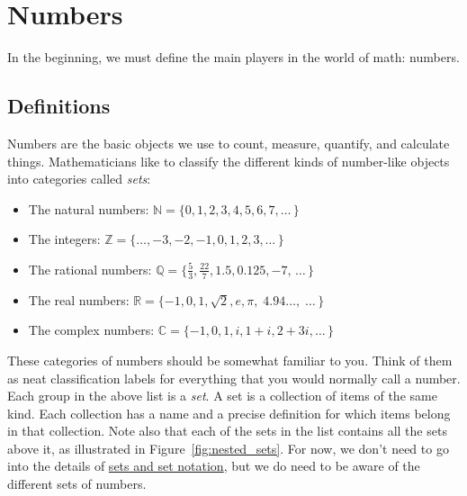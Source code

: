 
\section{Numbers}
\label{sec:numbers}

	In the beginning, we must define the main players in the world of math: numbers.

	\subsection{Definitions}
	\label{numbers:definitions}
		
		Numbers are the basic objects we use to count, measure, quantify, and calculate things.
		Mathematicians like to classify the different kinds of number-like objects into categories called \emph{sets}:					
		\begin{itemize}
			\item  The natural numbers: $\mathbb{N} = \{0,1,2,3,4,5,6,7, \ldots \, \}$
			\item  The integers: $\mathbb{Z} = \{\ldots, -3,-2,-1,0,1,2,3 , \ldots  \, \}$
			\item  The rational numbers: $\mathbb{Q} = \{\frac{5}{3}, \frac{22}{7}, 1.5, 0.125,  -7, \, \ldots \, \}$
			\item  The real numbers: $\mathbb{R} = \{-1,0,1, \sqrt{2}, e,\pi, \;  4.94\ldots, \; \ldots \, \}$
			\item  The complex numbers: $\mathbb{C} = \{ -1, 0, 1, i,  1+i, 2+3i,  \ldots \, \}$
		\end{itemize}
		These categories of numbers should be somewhat familiar to you.
		Think of them as neat classification labels for everything that you would normally call a number. 
	 	Each group in the above list is a \emph{set}.
		A set is a collection of items of the same kind. 
		Each collection has a name and a precise definition for which items belong in that collection.
		Note also that each of the sets in the list contains all the sets above it,												
		as illustrated in Figure~\ref{fig:nested_sets}.
		For now, we don't need to go into the details of \hyperref[sec:set_notation]{sets and set notation},
		but we do need to be aware of the different sets of numbers.

